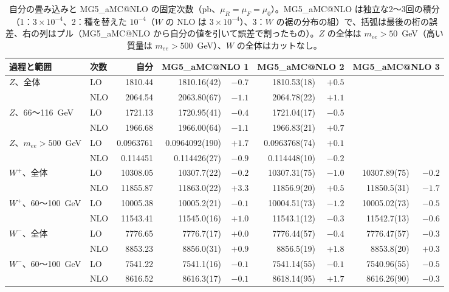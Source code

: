 \documentclass[a4paper,10pt]{ltjsarticle}
\makeatletter
\newcommand{\MGaMC}{MG5\_aMC@NLO}
\makeatother
\begin{document}
\begin{table}[htbp]
\centering\small
\caption{自分の畳み込みと \MGaMC{} の固定次数（pb、$\mu_R=\mu_F=\mu_0$）。\MGaMC{} は独立な2〜3回の積分（1：$3\times10^{-4}$、2：種を替えた $10^{-4}$（$W$ の NLO は $3\times10^{-4}$）、3：$W$ の裾の分布の組）で、括弧は最後の桁の誤差、右の列はプル（\MGaMC{} から自分の値を引いて誤差で割ったもの）。$Z$ の全体は $m_{ee}>50$~GeV（高い質量は $m_{ee}>500$~GeV）、$W$ の全体はカットなし。}
\label{tab:dytot}
\begin{tabular}{llrrrrrrr}
\toprule
過程と範囲 & 次数 & 自分 & \multicolumn{2}{c}{\MGaMC{} 1} & \multicolumn{2}{c}{\MGaMC{} 2} & \multicolumn{2}{c}{\MGaMC{} 3} \\
\midrule
$Z$、全体 & LO & 1810.44 & 1810.16(42) & $-0.7$ & 1810.53(18) & $+0.5$ & &  \\
 & NLO & 2064.54 & 2063.80(67) & $-1.1$ & 2064.78(22) & $+1.1$ & &  \\
$Z$、66〜116~GeV & LO & 1721.13 & 1720.95(41) & $-0.4$ & 1721.04(17) & $-0.5$ & &  \\
 & NLO & 1966.68 & 1966.00(64) & $-1.1$ & 1966.83(21) & $+0.7$ & &  \\
$Z$、$m_{ee}>500$~GeV & LO & 0.0963761 & 0.0964092(190) & $+1.7$ & 0.0963768(74) & $+0.1$ & &  \\
 & NLO & 0.114451 & 0.114426(27) & $-0.9$ & 0.114448(10) & $-0.2$ & &  \\
$W^+$、全体 & LO & 10308.05 & 10307.7(22) & $-0.2$ & 10307.31(75) & $-1.0$ & 10307.89(75) & $-0.2$ \\
 & NLO & 11855.87 & 11863.0(22) & $+3.3$ & 11856.9(20) & $+0.5$ & 11850.5(31) & $-1.7$ \\
$W^+$、60〜100~GeV & LO & 10005.38 & 10005.2(21) & $-0.1$ & 10004.51(73) & $-1.2$ & 10005.02(73) & $-0.5$ \\
 & NLO & 11543.41 & 11545.0(16) & $+1.0$ & 11543.1(12) & $-0.3$ & 11542.7(13) & $-0.6$ \\
$W^-$、全体 & LO & 7776.65 & 7776.7(17) & $+0.0$ & 7776.44(57) & $-0.4$ & 7776.47(57) & $-0.3$ \\
 & NLO & 8853.23 & 8856.0(31) & $+0.9$ & 8856.5(19) & $+1.8$ & 8853.8(20) & $+0.3$ \\
$W^-$、60〜100~GeV & LO & 7541.22 & 7541.1(16) & $-0.1$ & 7541.14(55) & $-0.1$ & 7540.96(55) & $-0.5$ \\
 & NLO & 8616.52 & 8616.3(17) & $-0.1$ & 8618.14(95) & $+1.7$ & 8616.26(90) & $-0.3$ \\
\bottomrule
\end{tabular}
\end{table}
\end{document}
